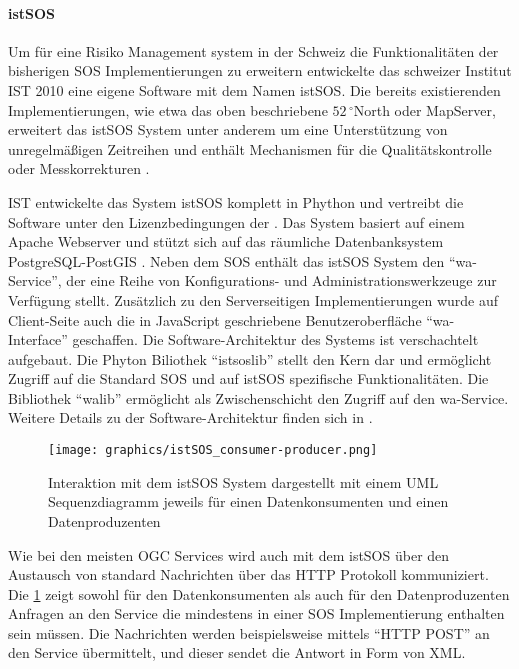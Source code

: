 \paragraph{istSOS}
Um für eine Risiko Management system in der Schweiz die Funktionalitäten der bisherigen \gls{SOS} Implementierungen zu erweitern entwickelte das schweizer Institut \gls{IST} 2010 eine eigene Software mit dem Namen \gls{istSOS}. Die bereits existierenden Implementierungen, wie etwa das oben beschriebene $52\,^{\circ}$North  oder MapServer, erweitert das \gls{istSOS} System unter anderem um eine Unterstützung von unregelmäßigen Zeitreihen und enthält Mechanismen für die Qualitätskontrolle oder Messkorrekturen \citep{cannata_istsos_2013}. 

\gls{IST} entwickelte das System \gls{istSOS} komplett in Phython und vertreibt die Software unter den Lizenzbedingungen der . Das System basiert auf einem Apache Webserver \citep{apache_software_fundation_welcome!_2014} und stützt sich auf das räumliche Datenbanksystem PostgreSQL-PostGIS \citep{postgis_project_steering_committee_postgis_2014}. Neben dem \gls{SOS} enthält das \gls{istSOS} System den ``wa-Service'', der eine Reihe von Konfigurations- und Administrationswerkzeuge zur Verfügung stellt. Zusätzlich zu den Serverseitigen Implementierungen wurde auf Client-Seite auch die in JavaScript geschriebene Benutzeroberfläche ``wa-Interface'' geschaffen. Die Software-Architektur des Systems ist verschachtelt aufgebaut. Die Phyton Biliothek ``istsoslib'' stellt den Kern dar und ermöglicht Zugriff auf die Standard \gls{SOS} und auf \gls{istSOS} spezifische Funktionalitäten. Die Bibliothek ``walib'' ermöglicht als Zwischenschicht den Zugriff auf den wa-Service. Weitere Details zu der Software-Architektur finden sich in \citep{cannata_istsos_2013}\citep{cannata_istsos:_2010}.

\begin{figure}[H]
	\centering
 	 \texttt{[image: graphics/istSOS\_consumer-producer.png]} 
	\caption{Interaktion mit dem istSOS System dargestellt mit einem UML Sequenzdiagramm jeweils für einen Datenkonsumenten und einen Datenproduzenten \citep{cannata_welcome_2014}}
	 \label{fig:istsos_consumer-producer}
\end{figure}

Wie bei den meisten \gls{OGC} Services wird auch mit dem \gls{istSOS} über den Austausch von standard Nachrichten über das \gls{HTTP} Protokoll kommuniziert. Die  \ref{fig:istsos_consumer-producer} zeigt sowohl für den Datenkonsumenten als auch für den Datenproduzenten Anfragen an den Service die mindestens in einer \gls{SOS} Implementierung enthalten sein müssen. Die Nachrichten werden beispielsweise mittels ``HTTP POST'' an den Service übermittelt, und dieser sendet die Antwort in Form von \gls{XML}. 

